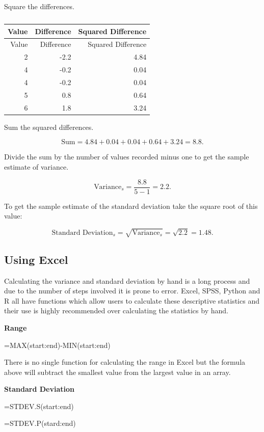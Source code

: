 \documentclass[
]{book}
\begin{document}
Square the differences.

\begin{longtable}[]{@{}rrr@{}}
\caption{\label{tab:table9}}\tabularnewline
\toprule
Value & Difference & Squared Difference \\
\midrule
\endfirsthead
\toprule
Value & Difference & Squared Difference \\
\midrule
\endhead
2 & -2.2 & 4.84 \\
4 & -0.2 & 0.04 \\
4 & -0.2 & 0.04 \\
5 & 0.8 & 0.64 \\
6 & 1.8 & 3.24 \\
\bottomrule
\end{longtable}

Sum the squared differences.

\[\textrm{Sum} = 4.84 + 0.04 + 0.04 + 0.64 + 3.24 = 8.8. \]

Divide the sum by the number of values recorded minus one to get the sample estimate of variance.

\[ \textrm{Variance}_{s} = \frac{8.8}{5-1} = 2.2.\]

To get the sample estimate of the standard deviation take the square root of this value:

\[ \textrm{Standard Deviation}_s = \sqrt{ \textrm{Variance}_{s}} = \sqrt{2.2} = 1.48.\]

\hypertarget{using-excel-1}{%
\subsection{Using Excel}\label{using-excel-1}}

Calculating the variance and standard deviation by hand is a long process and due to the number of steps involved it is prone to error. Excel, SPSS, Python and R all have functions which allow users to calculate these descriptive statistics and their use is highly recommended over calculating the statistics by hand.

\textbf{Range}

=MAX(start:end)-MIN(start:end)

There is no single function for calculating the range in Excel but the formula above will subtract the smallest value from the largest value in an array.

\textbf{Standard Deviation}

=STDEV.S(start:end)

=STDEV.P(stard:end)
\end{document}
